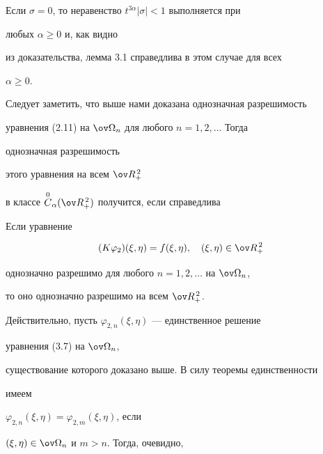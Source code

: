 \begin{notes}


Если $\sigma=0$, то неравенство $t^{3\alpha}|\sigma|<1$ выполняется при


любых $\alpha\ge 0$ и, как видно


из доказательства, лемма 3.1 справедлива в этом случае для всех


$\alpha\ge 0$.


\end{notes}





Следует заметить, что выше нами доказана однозначная разрешимость


уравнения (2.11) на $\ov\Omega_n$ для любого $n=1,2,\dotsc$ Тогда


однозначная разрешимость


этого уравнения на всем $\ov R^{\,2}_+$


в классе $\OC_\alpha(\ov R^{\,2}_+)$ получится, если справедлива





\begin{lems}


Если уравнение


\begin{equation}


(K\varphi_2)(\xi,\eta)=f(\xi,\eta),\quad


(\xi,\eta)\in \ov R^{\,2}_+


\end{equation}


однозначно разрешимо для любого $n=1,2,\dotsc$ на $\ov\Omega_n$,


то оно однозначно разрешимо на всем $\ov R^{\,2}_+$.


\end{lems}





Действительно, пусть $\varphi_{2,n}(\xi,\eta)$ --- единственное решение


уравнения (3.7) на $\ov\Omega_n$,


существование которого доказано выше. В силу теоремы единственности


имеем


$\varphi_{2,n}(\xi,\eta)=\varphi_{2,m}(\xi,\eta)$, если


$(\xi,\eta)\in\ov\Omega_n$ и $m>n$. Тогда, очевидно,


